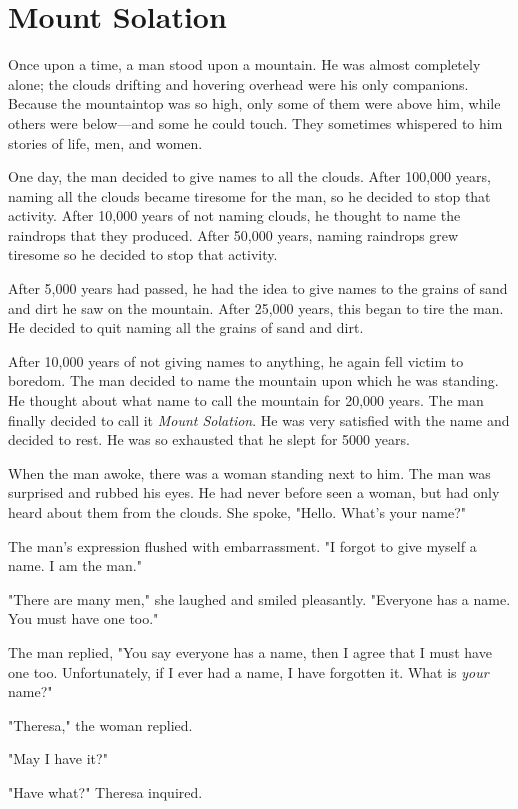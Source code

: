 \chapter{Mount Solation}

Once upon a time, a man stood upon a mountain. He was almost completely alone; the clouds drifting and hovering overhead were his only companions. Because the mountaintop was so high, only some of them were above him, while others were below—and some he could touch. They sometimes whispered to him stories of life, men, and women.

One day, the man decided to give names to all the clouds. After 100,000 years, naming all the clouds became tiresome for the man, so he decided to stop that activity. After 10,000 years of not naming clouds, he thought to name the raindrops that they produced. After 50,000 years, naming raindrops grew tiresome so he decided to stop that activity.

After 5,000 years had passed, he had the idea to give names to the grains of sand and dirt he saw on the mountain. After 25,000 years, this began to tire the man. He decided to quit naming all the grains of sand and dirt.

After 10,000 years of not giving names to anything, he again fell victim to boredom. The man decided to name the mountain upon which he was standing. He thought about what name to call the mountain for 20,000 years. The man finally decided to call it \textit{Mount Solation}. He was very satisfied with the name and decided to rest. He was so exhausted that he slept for 5000 years.

When the man awoke, there was a woman standing next to him. The man was surprised and rubbed his eyes. He had never before seen a woman, but had only heard about them from the clouds. She spoke, "Hello. What's your name?"

The man's expression flushed with embarrassment. "I forgot to give myself a name. I am the man."

"There are many men," she laughed and smiled pleasantly. "Everyone has a name. You must have one too."

The man replied, "You say everyone has a name, then I agree that I must have one too. Unfortunately, if I ever had a name, I have forgotten it. What is \textit{your} name?"

"Theresa," the woman replied.

"May I have it?"

"Have what?" Theresa inquired.

